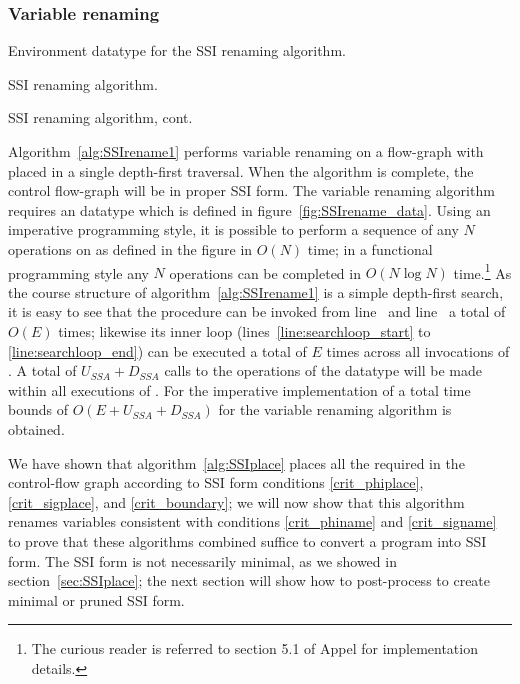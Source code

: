 \documentclass[12pt,titlepage,twoside]{article}
\begin{document}
\subsubsection{Variable renaming}
\begin{myfigure}[p]\small

\caption{Environment datatype for the SSI renaming algorithm.}
\label{fig:SSIrename_data}
\end{myfigure}
\begin{myalgorithm}\small

\caption{SSI renaming algorithm.}\label{alg:SSIrename1}
\end{myalgorithm}
\begin{myalgorithm}\small

\caption{SSI renaming algorithm, cont.}\label{alg:SSIrename2}
\end{myalgorithm}
Algorithm~\ref{alg:SSIrename1} performs variable renaming on a
flow-graph with placed  in a single depth-first
traversal.  When the algorithm is complete, the control flow-graph
will be in proper SSI form.  The variable renaming algorithm requires
an  datatype which is defined in
figure~\ref{fig:SSIrename_data}.  Using an imperative programming
style, it is possible to perform a sequence of any $N$ operations on
 as defined in the figure in $O(N)$ time; in a
functional programming style any $N$ operations can be completed in
$O(N \log N)$ time.\footnote{The curious reader is referred to section
5.1 of Appel \cite{appel:modern} for implementation details.}  As the
course structure of algorithm~\ref{alg:SSIrename1} is a simple
depth-first search, it is easy to see that the  procedure
can be invoked from line~ and
line~ a total of $O(E)$ times; likewise its
inner loop (lines~\ref{line:searchloop_start} to
\ref{line:searchloop_end}) can be executed a total of $E$ times across
all invocations of .  A total of $U_{SSA}+D_{SSA}$ calls
to the operations of the  datatype will be made
within all executions of .  For the imperative
implementation of  a total time bounds of
$O(E+U_{SSA}+D_{SSA})$ for the variable renaming algorithm is
obtained.

We have shown that algorithm~\ref{alg:SSIplace} places all the
required  in the control-flow graph according to SSI
form conditions \ref{crit_phiplace}, \ref{crit_sigplace}, and
\ref{crit_boundary}; we will now show that this algorithm renames
variables consistent with conditions \ref{crit_phiname} and
\ref{crit_signame} to prove that these algorithms combined suffice to
convert a program into SSI form.  The SSI form is not necessarily
minimal, as we showed in section~\ref{sec:SSIplace}; the next
section will show how to post-process to create minimal or pruned SSI
form.
\end{document}
